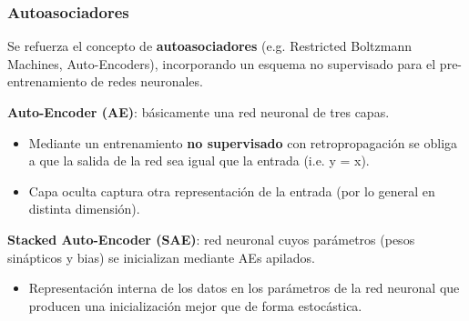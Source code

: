 \watermarkoff
\begin{frame}[t,fragile]
	\frametitle {Autoasociadores}
	
	Se refuerza el concepto de \textbf{autoasociadores} (e.g. Restricted Boltzmann Machines, Auto-Encoders), incorporando un esquema no supervisado para el pre-entrenamiento de redes neuronales.
	\pause
	
		\begin{block}{}
			\textbf{Auto-Encoder (AE)}: básicamente una red neuronal de tres capas.
			\begin{itemize}
				\item Mediante un entrenamiento \textbf{no supervisado} con retropropagación se obliga a que la salida de la red sea igual que la entrada (i.e. y = x). 
				
				\item Capa oculta captura otra representación de la entrada (por lo general en distinta dimensión). %
			\end{itemize} 
		\end{block}
		
		\begin{block}{}
			\textbf{Stacked Auto-Encoder (SAE)}: red neuronal cuyos parámetros (pesos sinápticos y bias) se inicializan mediante AEs apilados.
			
			\begin{itemize}
				\item Representación interna de los datos en los parámetros de la red neuronal que producen una inicialización mejor que de forma estocástica.
			\end{itemize}
		\end{block}
			
	
\end{frame}
\watermarkon
\watermarkoff
